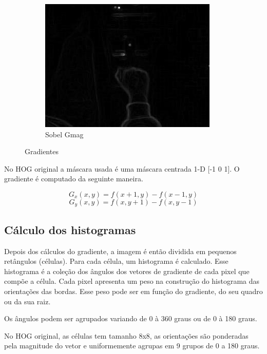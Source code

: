 \begin{figure}
    \begin{subfigure}[b]{0.3\textwidth}
        \includegraphics[width=\textwidth]{image/gradiente_sobel_mag.jpg}
        \caption{Sobel Gmag}
        \label{fig:gradiente_gmag}
    \end{subfigure}
    \caption{Gradientes}\label{fig:gradientes}
\end{figure}

No HOG original a máscara usada é uma máscara centrada 1-D [-1 0 1]. O gradiente é computado da seguinte maneira.

\[G_{x}(x,y) = f(x+1, y) - f(x-1, y)\]
\[G_{y}(x,y) = f(x, y+1) - f(x, y-1)\]

\subsection{Cálculo dos histogramas}

Depois dos cálculos do gradiente, a imagem é então dividida em pequenos retângulos (células). Para cada célula, um histograma é calculado. Esse histograma é a coleção dos ângulos dos vetores de gradiente de cada pixel que compõe a célula. Cada pixel apresenta um peso na construção do histograma das orientações das bordas. Esse peso pode ser em função do gradiente, do seu quadro ou da sua raiz.

Os ângulos podem ser agrupados variando de 0 à 360 graus ou de 0 à 180 graus.

No HOG original, as células tem tamanho 8x8, as orientações são ponderadas pela magnitude do vetor e uniformemente agrupas em 9 grupos de 0 a 180 graus.

